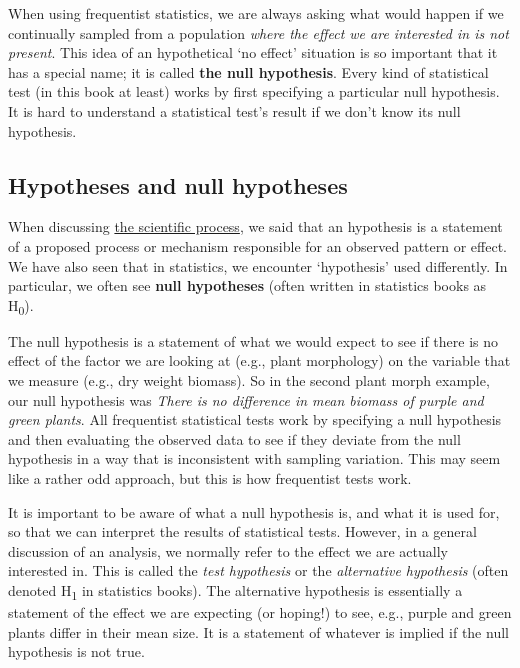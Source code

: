 \documentclass[
]{book}
\begin{document}
When using frequentist statistics, we are always asking what would happen if we continually sampled from a population \emph{where the effect we are interested in is not present}. This idea of an hypothetical `no effect' situation is so important that it has a special name; it is called \textbf{the null hypothesis}. Every kind of statistical test (in this book at least) works by first specifying a particular null hypothesis. It is hard to understand a statistical test's result if we don't know its null hypothesis.

\hypertarget{hypotheses-and-null-hypotheses}{%
\subsection{Hypotheses and null hypotheses}\label{hypotheses-and-null-hypotheses}}

When discussing \protect\hyperlink{stages-hypotheses}{the scientific process}, we said that an hypothesis is a statement of a proposed process or mechanism responsible for an observed pattern or effect. We have also seen that in statistics, we encounter `hypothesis' used differently. In particular, we often see \textbf{null hypotheses} (often written in statistics books as H\textsubscript{0}).

The null hypothesis is a statement of what we would expect to see if there is no effect of the factor we are looking at (e.g., plant morphology) on the variable that we measure (e.g., dry weight biomass). So in the second plant morph example, our null hypothesis was \emph{There is no difference in mean biomass of purple and green plants}. All frequentist statistical tests work by specifying a null hypothesis and then evaluating the observed data to see if they deviate from the null hypothesis in a way that is inconsistent with sampling variation. This may seem like a rather odd approach, but this is how frequentist tests work.

It is important to be aware of what a null hypothesis is, and what it is used for, so that we can interpret the results of statistical tests. However, in a general discussion of an analysis, we normally refer to the effect we are actually interested in. This is called the \emph{test hypothesis} or the \emph{alternative hypothesis} (often denoted H\textsubscript{1} in statistics books). The alternative hypothesis is essentially a statement of the effect we are expecting (or hoping!) to see, e.g., purple and green plants differ in their mean size. It is a statement of whatever is implied if the null hypothesis is not true.
\end{document}
